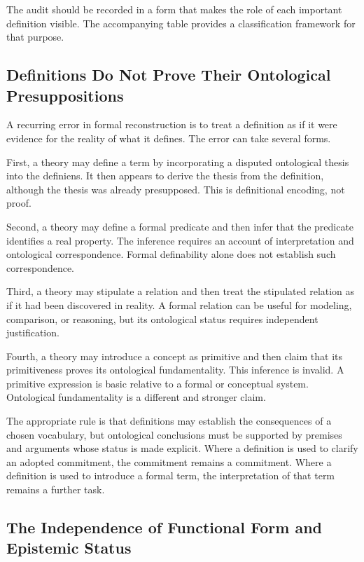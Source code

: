 The audit should be recorded in a form that makes the role of each
important definition visible. The accompanying table provides a
classification framework for that purpose.



\subsection{Definitions Do Not Prove Their Ontological Presuppositions}

A recurring error in formal reconstruction is to treat a definition
as if it were evidence for the reality of what it defines. The
error can take several forms.

First, a theory may define a term by incorporating a disputed
ontological thesis into the definiens. It then appears to derive
the thesis from the definition, although the thesis was already
presupposed. This is definitional encoding, not proof.

Second, a theory may define a formal predicate and then infer that
the predicate identifies a real property. The inference requires
an account of interpretation and ontological correspondence.
Formal definability alone does not establish such correspondence.

Third, a theory may stipulate a relation and then treat the
stipulated relation as if it had been discovered in reality. A
formal relation can be useful for modeling, comparison, or
reasoning, but its ontological status requires independent
justification.

Fourth, a theory may introduce a concept as primitive and then
claim that its primitiveness proves its ontological fundamentality.
This inference is invalid. A primitive expression is basic
relative to a formal or conceptual system. Ontological
fundamentality is a different and stronger claim.

The appropriate rule is that definitions may establish the
consequences of a chosen vocabulary, but ontological conclusions
must be supported by premises and arguments whose status is
made explicit. Where a definition is used to clarify an adopted
commitment, the commitment remains a commitment. Where a
definition is used to introduce a formal term, the interpretation
of that term remains a further task.

\subsection{The Independence of Functional Form and Epistemic Status}

